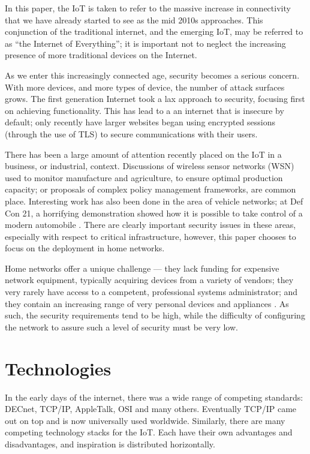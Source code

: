 \documentclass[10pt,journal,compsoc]{IEEEtran}
\begin{document}
In this paper, the IoT is taken to refer to the massive increase in
connectivity that we have already started to see as the mid 2010s approaches.
This conjunction of the traditional internet, and the emerging IoT, may be
referred to as ``the Internet of Everything''; it is important not to neglect
the increasing presence of more traditional devices on the Internet. 

As we enter this increasingly connected age, security becomes a serious
concern. With more devices, and more types of device, the number of attack
surfaces grows. The first generation Internet took a lax approach to security,
focusing first on achieving functionality. This has lead to a an internet that
is insecure by default; only recently have larger websites began using
encrypted sessions (through the use of TLS) to secure communications with their
users. 

There has been a large amount of attention recently placed on the IoT in a
business, or industrial, context. Discussions of wireless sensor networks (WSN)
used to monitor manufacture and agriculture, to ensure optimal production
capacity; or proposals of complex policy management frameworks, are common
place. Interesting work has also been done in the area of vehicle networks; at
Def Con 21, a horrifying demonstration showed how it is possible to take
control of a modern automobile \cite{Illera2014}. There are clearly important
security issues in these areas, especially with respect to critical
infrastructure, however, this paper chooses to focus on the deployment in home
networks. 

Home networks offer a unique challenge — they lack funding for expensive
network equipment, typically acquiring devices from a variety of vendors; they
very rarely have access to a competent, professional systems administrator; and
they contain an increasing range of very personal devices and appliances
\cite{ACM_ModHome}. As such, the security requirements tend to be high, while
the difficulty of configuring the network to assure such a level of security
must be very low. 


\section{Technologies}
In the early days of the internet, there was a wide range of competing
standards: DECnet, TCP/IP, AppleTalk, OSI and many others.  Eventually TCP/IP
came out on top and is now universally used worldwide. Similarly, there are
many competing technology stacks for the IoT. Each have their own advantages
and disadvantages, and inspiration is distributed horizontally. 
\end{document}
